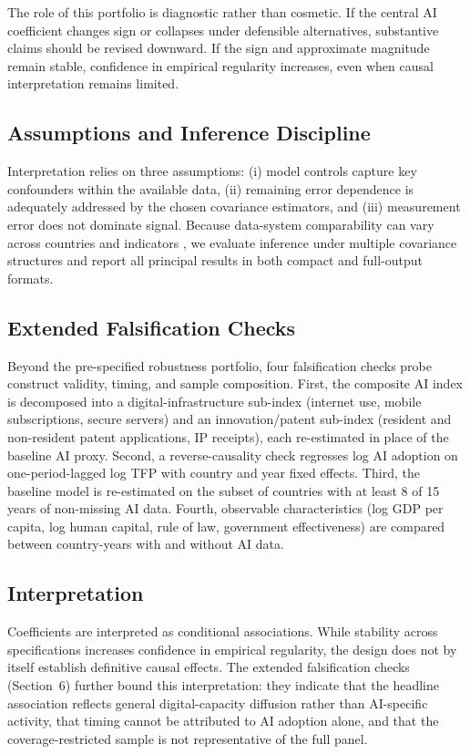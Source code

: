 The role of this portfolio is diagnostic rather than cosmetic. If the central AI coefficient changes sign or collapses under defensible alternatives, substantive claims should be revised downward. If the sign and approximate magnitude remain stable, confidence in empirical regularity increases, even when causal interpretation remains limited.

\subsection{Assumptions and Inference Discipline}

Interpretation relies on three assumptions: (i) model controls capture key confounders within the available data, (ii) remaining error dependence is adequately addressed by the chosen covariance estimators, and (iii) measurement error does not dominate signal. Because data-system comparability can vary across countries and indicators \cite{worldbank2021wdr,worldbankWDI2024}, we evaluate inference under multiple covariance structures and report all principal results in both compact and full-output formats.

\subsection{Extended Falsification Checks}

Beyond the pre-specified robustness portfolio, four falsification checks probe construct validity, timing, and sample composition. First, the composite AI index is decomposed into a digital-infrastructure sub-index (internet use, mobile subscriptions, secure servers) and an innovation/patent sub-index (resident and non-resident patent applications, IP receipts), each re-estimated in place of the baseline AI proxy. Second, a reverse-causality check regresses log AI adoption on one-period-lagged log TFP with country and year fixed effects. Third, the baseline model is re-estimated on the subset of countries with at least 8 of 15 years of non-missing AI data. Fourth, observable characteristics (log GDP per capita, log human capital, rule of law, government effectiveness) are compared between country-years with and without AI data.

\subsection{Interpretation}

Coefficients are interpreted as conditional associations. While stability across specifications increases confidence in empirical regularity, the design does not by itself establish definitive causal effects. The extended falsification checks (Section~6) further bound this interpretation: they indicate that the headline association reflects general digital-capacity diffusion rather than AI-specific activity, that timing cannot be attributed to AI adoption alone, and that the coverage-restricted sample is not representative of the full panel.


